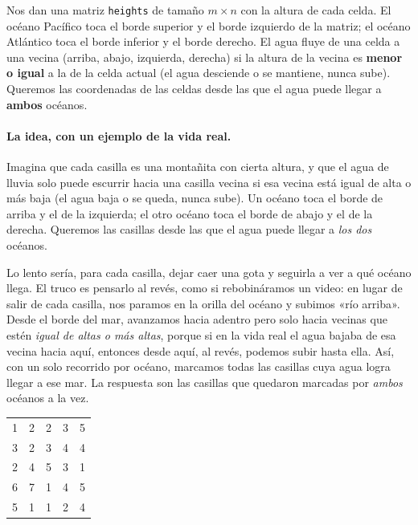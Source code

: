 
Nos dan una matriz \texttt{heights} de tamaño $m\times n$ con la altura de
cada celda. El océano Pacífico toca el borde superior y el borde izquierdo de
la matriz; el océano Atlántico toca el borde inferior y el borde derecho. El
agua fluye de una celda a una vecina (arriba, abajo, izquierda, derecha) si la
altura de la vecina es \textbf{menor o igual} a la de la celda actual (el
agua desciende o se mantiene, nunca sube). Queremos las coordenadas de las
celdas desde las que el agua puede llegar a \textbf{ambos} océanos.

\paragraph{La idea, con un ejemplo de la vida real.} Imagina que cada casilla es
una montañita con cierta altura, y que el agua de lluvia solo puede escurrir
hacia una casilla vecina si esa vecina está igual de alta o más baja (el agua
baja o se queda, nunca sube). Un océano toca el borde de arriba y el de la
izquierda; el otro océano toca el borde de abajo y el de la derecha. Queremos
las casillas desde las que el agua puede llegar a \emph{los dos} océanos.

Lo lento sería, para cada casilla, dejar caer una gota y seguirla a ver a qué
océano llega. El truco es pensarlo al revés, como si rebobináramos un video:
en lugar de salir de cada casilla, nos paramos en la orilla del océano y
subimos «río arriba». Desde el borde del mar, avanzamos hacia adentro pero solo
hacia vecinas que estén \emph{igual de altas o más altas}, porque si en la vida
real el agua bajaba de esa vecina hacia aquí, entonces desde aquí, al revés,
podemos subir hasta ella. Así, con un solo recorrido por océano, marcamos todas
las casillas cuya agua logra llegar a ese mar. La respuesta son las casillas
que quedaron marcadas por \emph{ambos} océanos a la vez.

\begin{center}
\ttfamily
\begin{tabular}{ccccc}
1 & 2 & 2 & 3 & 5\\
3 & 2 & 3 & 4 & 4\\
2 & 4 & 5 & 3 & 1\\
6 & 7 & 1 & 4 & 5\\
5 & 1 & 1 & 2 & 4\\
\end{tabular}
\end{center}

